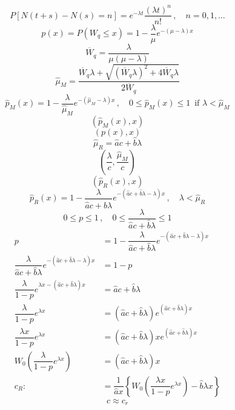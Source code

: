 \documentclass[hidelinks,14pt]{extarticle} %
\begin{document}
\[P[N(t+s) - N(s) = n] = e^{-\lambda t} \dfrac{(\lambda t)^n}{n!}\, , \quad n = 0, 1, \dots\]
\[p(x) = P(W_q\leq x) = 1 - \dfrac{\lambda}{\mu}e^{-(\mu-\lambda)x}\]
\[\overline{W}_q = \dfrac{\lambda}{\mu(\mu - \lambda)}\]
\[\widehat{\mu}_M = \dfrac{\overline{W}_q\lambda + \sqrt{(\overline{W}_q\lambda)^2 + 4\overline{W}_q\lambda}}{2 \overline{W}_q}\]
\[\widehat{p}_M(x) = 1 - \dfrac{\lambda}{\widehat{\mu}_M}e^{-(\widehat{\mu}_M - \lambda)x}\,, \quad 0\leq \widehat{p}_M(x) \leq 1\,\text{ if } \lambda< \widehat{\mu}_M\]
\[\left(\widehat{p}_M(x), x\right)\]
\[(p(x),x)\]
\[\widehat{\mu}_R = \widehat{a}c + \widehat{b}\lambda\]
\[\left(\dfrac{\lambda}{c},\dfrac{\widehat{\mu}_M}{c}\right)\]
\[\left(\widehat{p}_R(x),x\right)\]
\[\widehat{p}_R(x) = 1 - \dfrac{\lambda}{\widehat{a}c + \widehat{b}\lambda} e^{-\left(\widehat{a}c +\widehat{b}\lambda - \lambda\right)x}\,,\quad\lambda<\widehat{\mu}_R\]\pagebreak
\[0\leq p \leq 1\,, \quad0\leq\dfrac{\lambda}{\widehat{a}c + \widehat{b}\lambda}\leq1\]
\begin{align*}
	p &= 1 - \dfrac{\lambda}{\widehat{a}c + \widehat{b}\lambda} e^{-\left(\widehat{a}c +\widehat{b}\lambda - \lambda\right)x}\\
	\dfrac{\lambda}{\widehat{a}c + \widehat{b}\lambda} e^{-\left(\widehat{a}c +\widehat{b}\lambda - \lambda\right)x} &= 1 - p\\
	\dfrac{\lambda}{1-p}e^{\lambda x-\left(\widehat{a}c+\widehat{b}\lambda\right)x}&=\widehat{a}c+\widehat{b}\lambda\\
	\dfrac{\lambda}{1-p}e^{\lambda x} &= \left(\widehat{a}c+\widehat{b}\lambda\right)e^{\left(\widehat{a}c+\widehat{b}\lambda\right)x}\\
	\dfrac{\lambda x}{1-p}e^{\lambda x} &= \left(\widehat{a}c+\widehat{b}\lambda\right)xe^{\left(\widehat{a}c+\widehat{b}\lambda\right)x}\\
	W_0\left(\dfrac{\lambda}{1-p}e^{\lambda x}\right) &= \left(\widehat{a}c + \widehat{b}\lambda\right)x\\
	c_R :&= \dfrac{1}{\widehat{a}x}\left\{W_0\left(\dfrac{\lambda x}{1-p}e^{\lambda x}\right) - \widehat{b}\lambda x\right\}
\end{align*}
\[c\approx c_r\]
\end{document}
